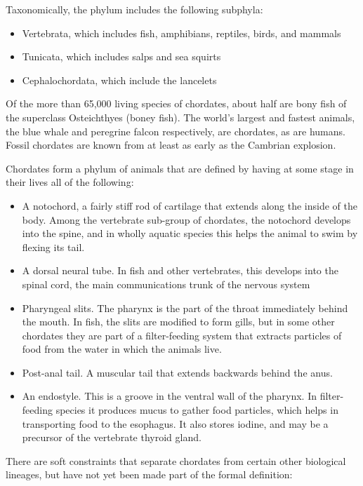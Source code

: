 Taxonomically, the phylum includes the following subphyla:

\begin{itemize}
\tightlist
\item
  Vertebrata, which includes fish, amphibians, reptiles, birds, and
  mammals
\item
  Tunicata, which includes salps and sea squirts
\item
  Cephalochordata, which include the lancelets
\end{itemize}

Of the more than 65,000 living species of chordates, about half are bony
fish of the superclass Osteichthyes (boney fish). The world's largest
and fastest animals, the blue whale and peregrine falcon respectively,
are chordates, as are humans. Fossil chordates are known from at least
as early as the Cambrian explosion.

Chordates form a phylum of animals that are defined by having at some
stage in their lives all of the following:

\begin{itemize}
\tightlist
\item
  A notochord, a fairly stiff rod of cartilage that extends along the
  inside of the body. Among the vertebrate sub-group of chordates, the
  notochord develops into the spine, and in wholly aquatic species this
  helps the animal to swim by flexing its tail.
\item
  A dorsal neural tube. In fish and other vertebrates, this develops
  into the spinal cord, the main communications trunk of the nervous
  system
\item
  Pharyngeal slits. The pharynx is the part of the throat immediately
  behind the mouth. In fish, the slits are modified to form gills, but
  in some other chordates they are part of a filter-feeding system that
  extracts particles of food from the water in which the animals live.
\item
  Post-anal tail. A muscular tail that extends backwards behind the
  anus.
\item
  An endostyle. This is a groove in the ventral wall of the pharynx. In
  filter-feeding species it produces mucus to gather food particles,
  which helps in transporting food to the esophagus. It also stores
  iodine, and may be a precursor of the vertebrate thyroid gland.
\end{itemize}

There are soft constraints that separate chordates from certain other
biological lineages, but have not yet been made part of the formal
definition:

